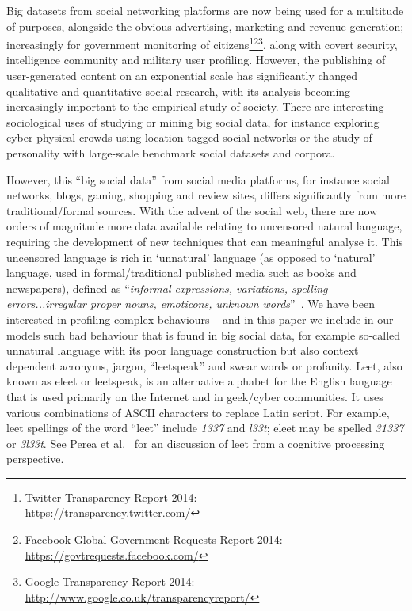\documentclass{AISB2008}
\begin{document}
Big datasets from social networking platforms are now being used for a
multitude of purposes, alongside the obvious advertising, marketing
and revenue generation; increasingly for government monitoring of
citizens\footnote{Twitter Transparency Report 2014:\\
\url{https://transparency.twitter.com/}}\footnote{Facebook Global
Government Requests Report
2014:\\\url{https://govtrequests.facebook.com/}}\footnote{Google
Transparency Report
2014:\\\url{http://www.google.co.uk/transparencyreport/}}, along with
covert security, intelligence community and military user profiling.
However, the publishing of user-generated content on an exponential
scale has significantly changed qualitative and quantitative social
research, with its analysis becoming increasingly important to the
empirical study of society. There are interesting sociological uses of
studying or mining big social data, for instance exploring
cyber-physical crowds using location-tagged social networks or the
study of personality with large-scale benchmark social datasets and
corpora.

However, this ``big social data'' from social media platforms, for
instance social networks, blogs, gaming, shopping and review sites,
differs significantly from more traditional/formal sources.  With the
advent of the social web, there are now orders of magnitude more data
available relating to uncensored natural language, requiring the
development of new techniques that can meaningful analyse it. This
uncensored language is rich in `unnatural' language (as opposed to
`natural' language, used in formal/traditional published media such as
books and newspapers), defined as ``{\emph{informal expressions,
variations, spelling errors...irregular proper nouns, emoticons,
unknown words}}''~\cite{ULPCproc}.  We have been interested in
profiling complex behaviours ~\cite{oatley+crick:2014} and in this
paper we include in our models such bad behaviour that is found in big
social data, for example so-called unnatural language with its poor
language construction but also context dependent acronyms, jargon,
``leetspeak'' and swear words or profanity.  Leet, also known as eleet
or leetspeak, is an alternative alphabet for the English language that
is used primarily on the Internet and in geek/cyber communities. It
uses various combinations of ASCII characters to replace Latin
script. For example, leet spellings of the word ``leet'' include
{\emph{1337}} and {\emph{l33t}}; eleet may be spelled {\emph{31337}}
or {\emph{3l33t}}. See Perea et al.~\cite{perea-et-al:2008} for an
discussion of leet from a cognitive processing perspective.
\end{document}
